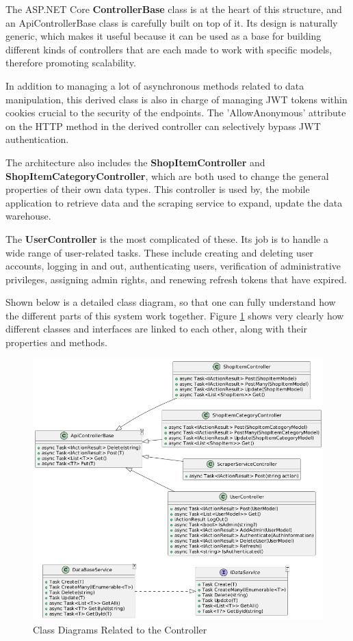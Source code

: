 The ASP.NET Core \textbf{ControllerBase} class is at the heart of this structure, and an ApiControllerBase class is carefully built on top of it. Its design is naturally generic, which makes it useful because it can be used as a base for building different kinds of controllers that are each made to work with specific models, therefore promoting scalability.

In addition to managing a lot of asynchronous methods related to data manipulation, this derived class is also in charge of managing JWT tokens within cookies crucial to the security of the endpoints. The 'AllowAnonymous' attribute on the HTTP method in the derived controller can selectively bypass JWT authentication.

The architecture also includes the \textbf{ShopItemController} and \textbf{ShopItemCategoryController}, which are both used to change the general properties of their own data types. This controller is used by, the mobile application to retrieve data and the scraping service to expand, update the data warehouse.

The \textbf{UserController} is the most complicated of these. Its job is to handle a wide range of user-related tasks. These include creating and deleting user accounts, logging in and out, authenticating users, verification of administrative privileges, assigning admin rights, and renewing refresh tokens that have expired.

Shown below is a detailed class diagram, so that one can fully understand how the different parts of this system work together. Figure \ref{fig:ccd} shows very clearly how different classes and interfaces are linked to each other, along with their properties and methods.

\begin{figure}[H]
	\centering
	\includegraphics[width=1\linewidth]{img/controller_classdiagram.png}
	\caption{Class Diagrams Related to the Controller}
	\label{fig:ccd}
\end{figure}

